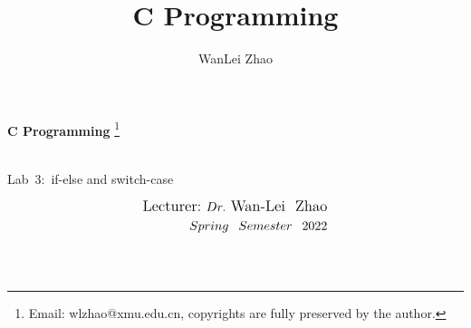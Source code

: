 \documentclass[t]{beamer}
\title{C Programming}
\author{WanLei Zhao}
\newcommand\blfootnote[1]{
  \begingroup
  \renewcommand\thefootnote{}\footnote{#1}
  \addtocounter{footnote}{-1}
  \endgroup
}
\begin{document}
\begin{frame}
   \begin{center}
    \vspace{24pt}
    \Huge\textbf{C Programming}\blfootnote{Email: wlzhao@xmu.edu.cn, copyrights are fully preserved by the author.}\\
     \Huge{\mbox{Lab 3: }if-else and switch-case}
    \vspace{36pt}
  \end{center}
  \begin{align*}
   \vspace{18pt}
      \large{\mbox{Lecturer:}~Dr.~\mbox{Wan-Lei~~Zhao}} \\
      \large{Spring~~Semester~~2022} \\
   \vspace{30pt}
  \end{align*}
\end{frame}



\section{}
\end{document}
